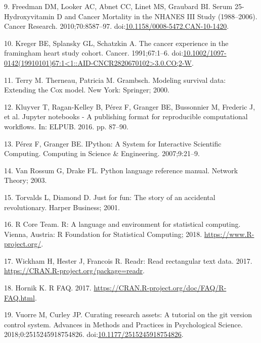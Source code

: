 \documentclass[12pt,oneside]{reedthesis}
\theoremstyle{definition}
\theoremstyle{definition}
\theoremstyle{definition}
\theoremstyle{remark}
\begin{document}
\leavevmode\hypertarget{ref-Freedman_2010}{}%
9. Freedman DM, Looker AC, Abnet CC, Linet MS, Graubard BI. Serum
25-Hydroxyvitamin D and Cancer Mortality in the NHANES III Study
(1988--2006). Cancer Research. 2010;70:8587--97.
doi:\href{https://doi.org/10.1158/0008-5472.CAN-10-1420}{10.1158/0008-5472.CAN-10-1420}.

\leavevmode\hypertarget{ref-Kreger_1991}{}%
10. Kreger BE, Splansky GL, Schatzkin A. The cancer experience in the
framingham heart study cohort. Cancer. 1991;67:1--6.
doi:\href{https://doi.org/10.1002/1097-0142(19910101)67:1\%3C1::AID-CNCR2820670102\%3E3.0.CO;2-W}{10.1002/1097-0142(19910101)67:1\textless{}1::AID-CNCR2820670102\textgreater{}3.0.CO;2-W}.

\leavevmode\hypertarget{ref-Therneau_2000}{}%
11. Terry M. Therneau, Patricia M. Grambsch. Modeling survival data:
Extending the Cox model. New York: Springer; 2000.

\leavevmode\hypertarget{ref-Kluyver_2016}{}%
12. Kluyver T, Ragan-Kelley B, Pérez F, Granger BE, Bussonnier M,
Frederic J, et al. Jupyter notebooks - A publishing format for
reproducible computational workflows. In: ELPUB. 2016. pp. 87--90.

\leavevmode\hypertarget{ref-Perez_2007}{}%
13. Pérez F, Granger BE. IPython: A System for Interactive Scientific
Computing. Computing in Science \& Engineering. 2007;9:21--9.

\leavevmode\hypertarget{ref-python_2003}{}%
14. Van Rossum G, Drake FL. Python language reference manual. Network
Theory; 2003.

\leavevmode\hypertarget{ref-Torvalds_2001}{}%
15. Torvalds L, Diamond D. Just for fun: The story of an accidental
revolutionary. Harper Business; 2001.

\leavevmode\hypertarget{ref-Rcore_2018}{}%
16. R Core Team. R: A language and environment for statistical
computing. Vienna, Austria: R Foundation for Statistical Computing;
2018. \url{https://www.R-project.org/}.

\leavevmode\hypertarget{ref-readr_2017}{}%
17. Wickham H, Hester J, Francois R. Readr: Read rectangular text data.
2017. \url{https://CRAN.R-project.org/package=readr}.

\leavevmode\hypertarget{ref-Hornik_2017}{}%
18. Hornik K. R FAQ. 2017.
\url{https://CRAN.R-project.org/doc/FAQ/R-FAQ.html}.

\leavevmode\hypertarget{ref-Vuorre_2018}{}%
19. Vuorre M, Curley JP. Curating research assets: A tutorial on the git
version control system. Advances in Methods and Practices in
Psychological Science. 2018;0:2515245918754826.
doi:\href{https://doi.org/10.1177/2515245918754826}{10.1177/2515245918754826}.
\end{document}
